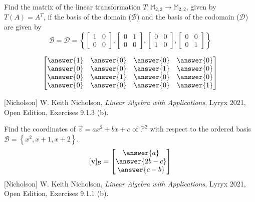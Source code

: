 \documentclass{ximera}
\begin{document}
 \begin{exercise}
Find the matrix of the linear transformation $T:\mathbb{M}_{2,2}\rightarrow \mathbb{M}_{2,2}$, given by $T(A)=A^T$, if the basis of the domain ($\mathcal{B}$) and the basis of the codomain ($\mathcal{D}$) are given by
$$\mathcal{B}=\mathcal{D}=\left\{\begin{bmatrix}1 & 0\\0 & 0\end{bmatrix},\begin{bmatrix}0 & 1\\0 & 0\end{bmatrix}, \begin{bmatrix}0 & 0\\1 & 0\end{bmatrix}, \begin{bmatrix}0 & 0\\0 & 1\end{bmatrix}\right\} $$

$$\begin{bmatrix}\answer{1} & \answer{0} & \answer{0} & \answer{0}\\\answer{0} & \answer{0} & \answer{1} & \answer{0}\\\answer{0} & \answer{1} & \answer{0} & \answer{0}\\\answer{0} & \answer{0} & \answer{0} & \answer{1}\end{bmatrix}$$

[Nicholson] W. Keith Nicholson, {\it Linear Algebra with Applications}, Lyryx 2021, Open Edition, Exercises 9.1.3 (b).  
 \end{exercise}


\begin{exercise}
Find the coordinates of $\vec{v}=ax^2+bx+c$ of $\mathbb{P}^2$ with respect to the ordered basis $\mathcal{B}=\left\{x^2, x+1, x+2\right\}$.
$$[\vec{v}]_{\mathcal{B}}=\begin{bmatrix}\answer{a}\\\answer{2b-c}\\\answer{c-b}\end{bmatrix}$$
[Nicholson] W. Keith Nicholson, {\it Linear Algebra with Applications}, Lyryx 2021, Open Edition, Exercises 9.1.1 (b).  
 \end{exercise}
\end{document}
